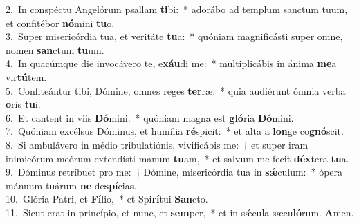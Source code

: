 {2.~}In conspéctu Angelórum psallam \textbf{ti}bi:~* adorábo ad templum sanctum tuum, et confitébor \textbf{nó}mini \textbf{tu}o.\\
{3.~}Super misericórdia tua, et veritáte \textbf{tu}a:~* quóniam magnificásti super omne, nomen \textbf{san}ctum \textbf{tu}um.\\
{4.~}In quacúmque die invocávero te, e\textbf{xáu}di me:~* multiplicábis in ánima \textbf{me}a vir\textbf{tú}tem.\\
{5.~}Confiteántur tibi, Dómine, omnes reges \textbf{ter}ræ:~* quia audiérunt ómnia verba \textbf{o}ris \textbf{tu}i.\\
{6.~}Et cantent in viis \textbf{Dó}mini:~* quóniam magna est \textbf{gló}ria \textbf{Dó}mini.\\
{7.~}Quóniam excélsus Dóminus, et humília \textbf{ré}spicit:~* et alta a \textbf{lon}ge co\textbf{gnó}scit.\\
{8.~}Si ambulávero in médio tribulatiónis, vivificábis me:~† et super iram inimicórum meórum extendísti manum \textbf{tu}am,~* et salvum me fecit \textbf{déx}tera \textbf{tu}a.\\
{9.~}Dóminus retríbuet pro me:~† Dómine, misericórdia tua in \textbf{sǽ}culum:~* ópera mánuum tuárum \textbf{ne} de\textbf{spí}cias.\\
{10.~}Glória Patri, et \textbf{Fí}lio,~* et Spi\textbf{rí}tui \textbf{San}cto.\\
{11.~}Sicut erat in princípio, et nunc, et \textbf{sem}per,~* et in sǽcula sæcu\textbf{ló}rum. \textbf{A}men.\\
